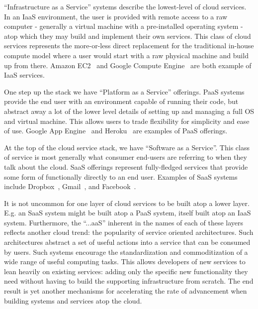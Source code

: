 \begin{packed_desc}
\item[IaaS:] ``Infrastructure as a Service'' systems describe the
  lowest-level of cloud services. In an IaaS environment, the user is
  provided with remote access to a raw computer - generally a virtual
  machine with a pre-installed operating system - atop which they may
  build and implement their own services. This class of cloud services
  represents the more-or-less direct replacement for the traditional
  in-house compute model where a user would start with a raw physical
  machine and build up from there. Amazon EC2~\cite{amazon-ec2} and
  Google Compute Engine~\cite{google-compute} are both example of IaaS
  services.
\item[PaaS:] One step up the stack we have ``Platform as a Service''
  offerings. PaaS systems provide the end user with an environment
  capable of running their code, but abstract away a lot of the lower
  level details of setting up and managing a full OS and virtual
  machine. This allows users to trade flexibility for simplicity and
  ease of use. Google App Engine~\cite{google-appengine} and
  Heroku~\cite{heroku} are examples of PaaS offerings.
\item[SaaS:] At the top of the cloud service stack, we have ``Software
  as a Service''. This class of service is most generally what
  consumer end-users are referring to when they talk about the
  cloud. SaaS offerings represent fully-fledged services that provide
  some form of functionally directly to an end user. Examples of SaaS
  systems include Dropbox~\cite{dropbox}, Gmail~\cite{google-gmail},
  and Facebook~\cite{facebook}.
\end{packed_desc}

It is not uncommon for one layer of cloud services to be built atop a
lower layer. E.g. an SaaS system might be built atop a PaaS system,
itself built atop an IaaS system. Furthermore, the ``...aaS'' inherent
in the names of each of these layers reflects another cloud trend: the
popularity of service oriented architectures. Such architectures
abstract a set of useful actions into a service that can be consumed
by users. Such systems encourage the standardization and
commoditization of a wide range of useful computing tasks. This allows
developers of new services to lean heavily on existing services:
adding only the specific new functionality they need without having to
build the supporting infrastructure from scratch. The end result is
yet another mechanisms for accelerating the rate of advancement when
building systems and services atop the cloud.

